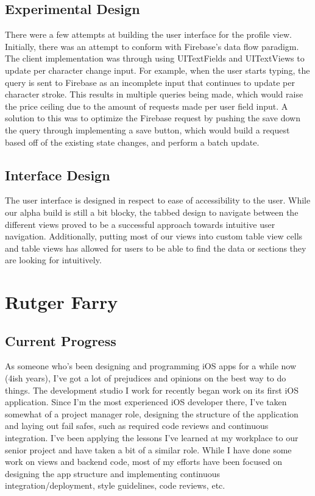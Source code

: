 \documentclass[a4paper]{article}
\begin{document}
\subsection{Experimental Design}

There were a few attempts at building the user interface for the profile view. Initially, there was an attempt to conform with Firebase's data flow paradigm. The client implementation was through using UITextFields and UITextViews to update per character change input. For example, when the user starts typing, the query is sent to Firebase as an incomplete input that continues to update per character stroke. This results in multiple queries being made, which would raise the price ceiling due to the amount of requests made per user field input. A solution to this was to optimize the Firebase request by pushing the save down the query through implementing a save button, which would build a request based off of the existing state changes, and perform a batch update.

\subsection{Interface Design}

The user interface is designed in respect to ease of accessibility to the user. While our alpha build is still a bit blocky, the tabbed design to navigate between the different views proved to be a successful approach towards intuitive user navigation. Additionally, putting most of our views into custom table view cells and table views has allowed for users to be able to find the data or sections they are looking for intuitively.

\section{Rutger Farry}

\subsection{Current Progress}
As someone who’s been designing and programming iOS apps for a while now (4ish years), I’ve got a lot of prejudices and opinions on the best way to do things. The development studio I work for recently began work on its first iOS application. Since I’m the most experienced iOS developer there, I’ve taken somewhat of a project manager role, designing the structure of the application and laying out fail safes, such as required code reviews and continuous integration. I’ve been applying the lessons I’ve learned at my workplace to our senior project and have taken a bit of a similar role. While I have done some work on views and backend code, most of my efforts have been focused on designing the app structure and implementing continuous integration/deployment, style guidelines, code reviews, etc.
\end{document}
